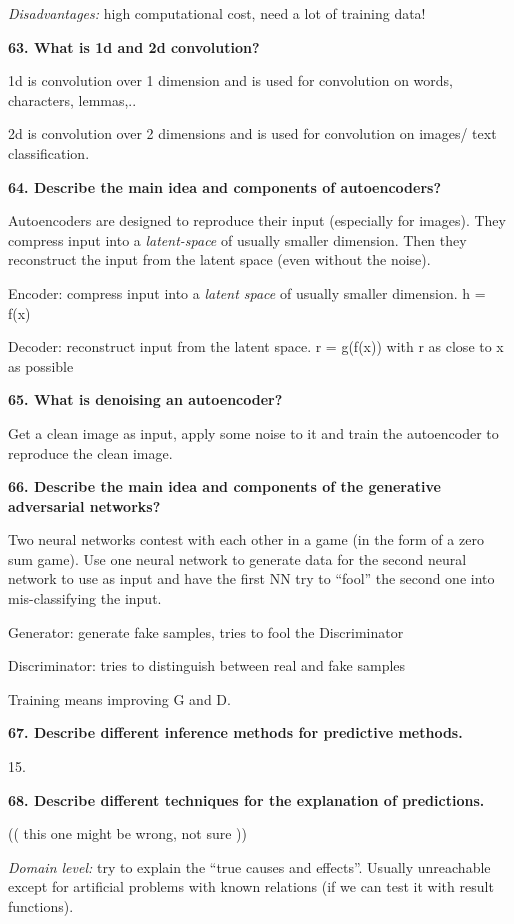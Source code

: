 \textit{Disadvantages:} high computational cost, need a lot of
training data!

\textbf{63. What is 1d and 2d convolution?}

1d is convolution over 1 dimension and is used for convolution on words,
characters, lemmas,..

2d is convolution over 2 dimensions and is used for convolution on
images/ text classification.

\textbf{64. Describe the main idea and components of autoencoders?}

Autoencoders are designed to reproduce their input (especially for
images). They compress input into a \emph{latent-space} of usually
smaller dimension. Then they reconstruct the input from the latent space
(even without the noise).

Encoder: compress input into a \emph{latent space} of usually smaller
dimension. h = f(x)

Decoder: reconstruct input from the latent space. r = g(f(x)) with r as
close to x as possible

\textbf{65. What is denoising an autoencoder?}

Get a clean image as input, apply some noise to it and train the
autoencoder to reproduce the clean image.

\textbf{66. Describe the main idea and components of the generative
adversarial networks?}

Two neural networks contest with each other in a game (in the form of a
zero sum game). Use one neural network to generate data for the second
neural network to use as input and have the first NN try to ``fool'' the
second one into mis-classifying the input.

Generator: generate fake samples, tries to fool the Discriminator

Discriminator: tries to distinguish between real and fake samples

Training means improving G and D.

\textbf{67. Describe different inference methods for predictive
methods.}

15.

\textbf{68. Describe different techniques for the explanation of
predictions.}

(( this one might be wrong, not sure ))

\textit{Domain level:} try to explain the ``true causes and
effects''. Usually unreachable except for artificial problems with known
relations (if we can test it with result functions).

